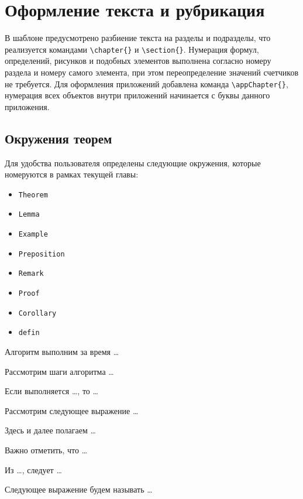 \section{Оформление текста и рубрикация}

В шаблоне предусмотрено разбиение текста на разделы и подразделы, что реализуется командами \verb|\chapter{}| и \verb|\section{}|. Нумерация формул, определений, рисунков и подобных элементов выполнена согласно номеру раздела и номеру самого элемента, при этом переопределение значений счетчиков не требуется. Для оформления приложений добавлена команда \verb|\appChapter{}|, нумерация всех объектов внутри приложений начинается с буквы данного приложения.

\subsection{Окружения теорем}
Для удобства пользователя определены следующие окружения, которые номеруются в рамках текущей главы:
\begin{itemize}
  \item \verb|Theorem|
  \item \verb|Lemma|
  \item \verb|Example|
  \item \verb|Preposition|
  \item \verb|Remark|
  \item \verb|Proof|
  \item \verb|Corollary|
  \item \verb|defin|
\end{itemize}

\begin{Theorem}
  Алгоритм выполним за время \dots
\end{Theorem}
\begin{Proof}
  Рассмотрим шаги алгоритма \dots
\end{Proof}
\begin{Lemma}
  Если выполняется \dots, то \dots
\end{Lemma}
\begin{Example}
  Рассмотрим следующее выражение \dots
\end{Example}
\begin{Preposition}
  Здесь и далее полагаем \dots
\end{Preposition}
\begin{Remark}
  Важно отметить, что \dots
\end{Remark}
\begin{Corollary}
  Из \dots, следует \dots
\end{Corollary}
\begin{defin}
  Следующее выражение будем называть \dots
\end{defin}

